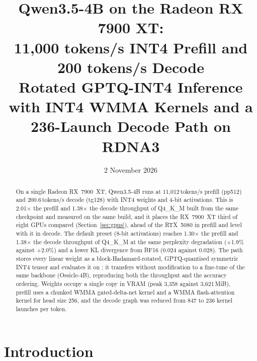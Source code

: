 \documentclass[10.5pt,a4paper]{article}
\title{\textbf{Qwen3.5-4B on the Radeon RX 7900 XT:\\ 11{,}000 tokens/s INT4 Prefill and 200 tokens/s Decode}\\[4pt]
\large Rotated GPTQ-INT4 Inference with INT4 WMMA Kernels and a 236-Launch Decode Path on RDNA3}
\author{}
\date{2 November 2026}
\newcommand{\tx}[1]{\texttt{\detokenize{#1}}}
\begin{document}
\maketitle
\vspace{-0.9cm}

\begin{abstract}
\noindent
On a single Radeon RX~7900~XT, Qwen3.5-4B runs at 11{,}012\,tokens/s prefill (pp512) and 200.6\,tokens/s decode (tg128) with INT4 weights and 4-bit activations. This is 2.01$\times$ the prefill and
1.38$\times$ the decode throughput of Q4\_K\_M built from the same checkpoint and measured on the same build, and it places the RX~7900~XT third of eight GPUs compared (Section~\ref{sec:gpus}), ahead of the
RTX~5080 in prefill and level with it in decode. The default preset (8-bit activations) reaches 1.30$\times$ the prefill and 1.38$\times$ the decode throughput of Q4\_K\_M at the same perplexity degradation
(+1.9\% against +2.0\%) and a lower KL divergence from BF16 (0.024 against 0.028). The path stores every linear weight as a block-Hadamard-rotated, GPTQ-quantised symmetric INT4 tensor and evaluates it on
\tx{v_wmma_i32_16x16x16_iu4}; it transfers without modification to a fine-tune of the same backbone (Ossicle-4B), reproducing both the throughput and the accuracy ordering. Weights occupy a single copy in VRAM
(peak 3{,}358 against 3{,}621\,MiB), prefill uses a chunked WMMA gated-delta-net kernel and a WMMA flash-attention kernel for head size 256, and the decode graph was reduced from 847 to 236 kernel launches per token.
\end{abstract}

\section{Introduction}
\end{document}
